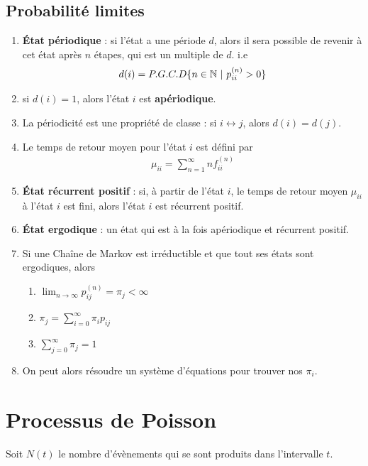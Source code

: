 \documentclass[10pt, french, landscape]{article}
\begin{document}
\begin{multicols*}{3}
\subsection*{Probabilité limites}
\begin{enumerate}[label=\faAngleRight]
\item \textbf{État périodique} : si l'état a une période $d$, alors il sera possible de revenir à cet état après $n$ étapes, qui est un multiple de $d$. i.e
\begin{align*}
d(i) = P.G.C.D\{n \in \mathbb{N} ~ | ~ p_{ii}^{(n)} > 0 \}
\end{align*}
\item si $d(i)=1$, alors l'état $i$ est \textbf{apériodique}.
\item La périodicité est une propriété de classe : si $i \leftrightarrow j$, alors $d(i) = d(j)$.
\item Le temps de retour moyen pour l'état $i$ est défini par
\begin{align*}
\mu_{ii} = \sum_{n=1}^{\infty} n f_{ii}^{(n)}
\end{align*}

\item \textbf{État récurrent positif} : si, à partir de l'état $i$, le temps de retour moyen $\mu_{ii}$ à l'état $i$ est fini, alors l'état $i$ est récurrent positif.

\item \textbf{État ergodique} : un état qui est à la fois apériodique et récurrent positif.

\item Si une Chaîne de Markov est irréductible et que tout ses états sont ergodiques, alors
\begin{enumerate}[label=(\arabic*)]
	\item $	\lim_{n \to \infty} p_{ij}^{(n)} = \pi_j < \infty$
	\item $\pi_j = \sum_{i=0}^{\infty} \pi_i p_{ij}$
	\item $\sum_{j=0}^{\infty} \pi_j = 1$
\end{enumerate}

\item On peut alors résoudre un système d'équations pour trouver nos $\pi_i$.
\end{enumerate}

\section{Processus de Poisson}
Soit $N(t)$ le nombre d'évènements qui se sont produits dans l'intervalle $t$.


\end{multicols*}
\end{document}
